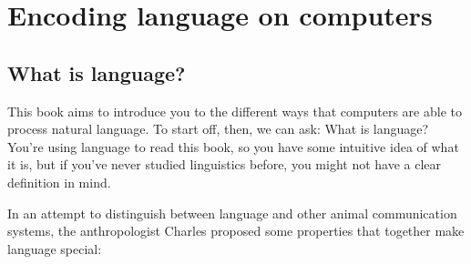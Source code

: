 \chapter[Encoding language]{Encoding language on computers}
\label{ch:encodings}

\section{What is language?}

This book aims to introduce you to the different ways that computers are able to process natural language.  To start off, then, we can ask: What is language?  You're using language to read this book, so you have some intuitive idea of what it is, but if you've never studied linguistics before, you might not have a clear definition in mind.

In an attempt to distinguish between language and other animal communication systems, the anthropologist  Charles \citet{Hockett:1960}  proposed some properties that together make language special:

